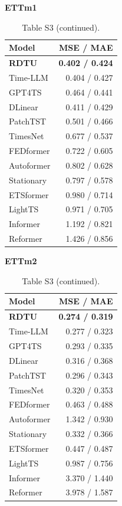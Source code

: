 \begin{table}[H]\centering\small
\caption*{Table S3 (continued).}
\begin{minipage}[t]{0.48\linewidth}\vspace{0pt}\centering\small
\textbf{ETTm1}\par\smallskip
\begin{tabular}{lr}\toprule Model & MSE / MAE\\\midrule
\rowcolor{blue!5}
\textbf{RDTU} & \textbf{0.402 / 0.424}\\
Time-LLM & 0.404 / 0.427\\
GPT4TS & 0.464 / 0.441\\
DLinear & 0.411 / 0.429\\
PatchTST & 0.501 / 0.466\\
TimesNet & 0.677 / 0.537\\
FEDformer & 0.722 / 0.605\\
Autoformer & 0.802 / 0.628\\
Stationary & 0.797 / 0.578\\
ETSformer & 0.980 / 0.714\\
LightTS & 0.971 / 0.705\\
Informer & 1.192 / 0.821\\
Reformer & 1.426 / 0.856\\
\bottomrule\end{tabular}\end{minipage}\hfill\begin{minipage}[t]{0.48\linewidth}\vspace{0pt}\centering\small
\textbf{ETTm2}\par\smallskip
\begin{tabular}{lr}\toprule Model & MSE / MAE\\\midrule
\rowcolor{blue!5}
\textbf{RDTU} & \textbf{0.274 / 0.319}\\
Time-LLM & 0.277 / 0.323\\
GPT4TS & 0.293 / 0.335\\
DLinear & 0.316 / 0.368\\
PatchTST & 0.296 / 0.343\\
TimesNet & 0.320 / 0.353\\
FEDformer & 0.463 / 0.488\\
Autoformer & 1.342 / 0.930\\
Stationary & 0.332 / 0.366\\
ETSformer & 0.447 / 0.487\\
LightTS & 0.987 / 0.756\\
Informer & 3.370 / 1.440\\
Reformer & 3.978 / 1.587\\
\bottomrule\end{tabular}\end{minipage}
\end{table}
